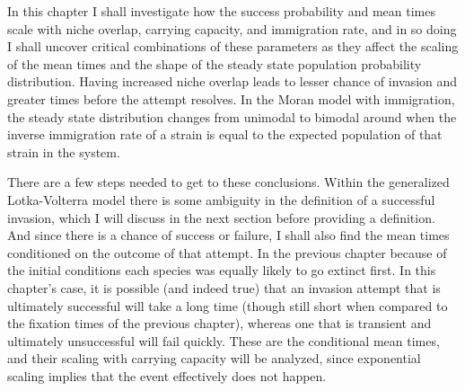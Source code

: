 In this chapter I shall investigate how the success probability and mean times scale with niche overlap, carrying capacity, and immigration rate, and in so doing I shall uncover critical combinations of these parameters as they affect the scaling of the mean times and the shape of the steady state population probability distribution. 
Having increased niche overlap leads to lesser chance of invasion and greater times before the attempt resolves. 
In the Moran model with immigration, the steady state distribution changes from unimodal to bimodal around when the inverse immigration rate of a strain is equal to the expected population of that strain in the system. 

There are a few steps needed to get to these conclusions. 
Within the generalized Lotka-Volterra model there is some ambiguity in the definition of a successful invasion, which I will discuss in the next section before providing a definition. 
And since there is a chance of success or failure, I shall also find the mean times conditioned on the outcome of that attempt. 
In the previous chapter because of the initial conditions each species was equally likely to go extinct first. 
In this chapter's case, it is possible (and indeed true) that an invasion attempt that is ultimately successful will take a long time (though still short when compared to the fixation times of the previous chapter), whereas one that is transient and ultimately unsuccessful will fail quickly. 
These are the conditional mean times, and their scaling with carrying capacity will be analyzed, since exponential scaling implies that the event effectively does not happen. 
